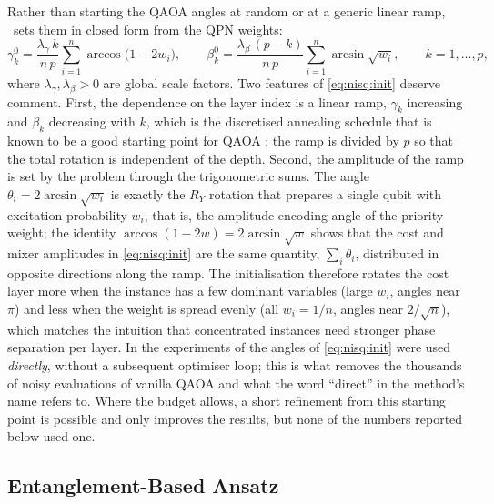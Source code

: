 Rather than starting the QAOA angles at random or at a generic linear ramp, \deal\ sets them in closed form from the QPN weights:
\begin{equation}\label{eq:nisq:init}
  \gamma_{k}^{0} = \frac{\lambda_{\gamma}\, k}{n\,p}\sum_{i=1}^{n} \arccos\bigl(1-2w_{i}\bigr),
  \qquad
  \beta_{k}^{0} = \frac{\lambda_{\beta}\,(p-k)}{n\,p}\sum_{i=1}^{n} \arcsin\sqrt{w_{i}},
  \qquad k=1,\dots,p,
\end{equation}
where $\lambda_{\gamma},\lambda_{\beta}>0$ are global scale factors. Two features of \cref{eq:nisq:init} deserve comment. First, the dependence on the layer index is a linear ramp, $\gamma_{k}$ increasing and $\beta_{k}$ decreasing with $k$, which is the discretised annealing schedule that is known to be a good starting point for QAOA \cite{weidenfeller2022qaoascaling,sachdeva2024qaoa127}; the ramp is divided by $p$ so that the total rotation is independent of the depth. Second, the amplitude of the ramp is set by the problem through the trigonometric sums. The angle $\theta_{i}=2\arcsin\sqrt{w_{i}}$ is exactly the $R_{Y}$ rotation that prepares a single qubit with excitation probability $w_{i}$, that is, the amplitude-encoding angle of the priority weight; the identity $\arccos(1-2w)=2\arcsin\sqrt{w}$ shows that the cost and mixer amplitudes in \cref{eq:nisq:init} are the same quantity, $\sum_{i}\theta_{i}$, distributed in opposite directions along the ramp. The initialisation therefore rotates the cost layer more when the instance has a few dominant variables (large $w_{i}$, angles near $\pi$) and less when the weight is spread evenly (all $w_{i}=1/n$, angles near $2/\sqrt{n}$), which matches the intuition that concentrated instances need stronger phase separation per layer. In the experiments of \cite{guo2025deal} the angles of \cref{eq:nisq:init} were used \emph{directly}, without a subsequent optimiser loop; this is what removes the thousands of noisy evaluations of vanilla QAOA and what the word ``direct'' in the method's name refers to. Where the budget allows, a short refinement from this starting point is possible and only improves the results, but none of the numbers reported below used one.

\subsection{Entanglement-Based Ansatz}\label{sec:nisq:ansatz}

